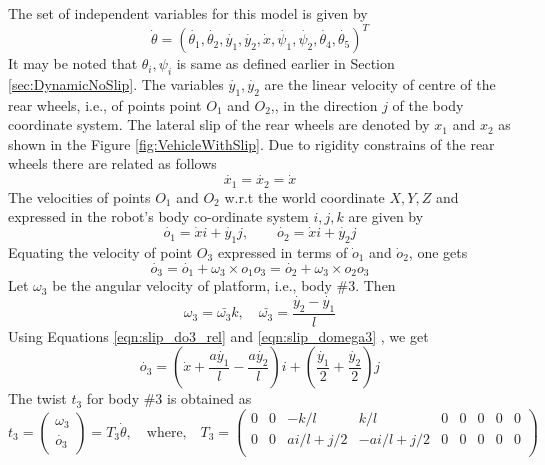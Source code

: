 
The set of independent variables for this model is given by
\begin{equation}
\label{eqn:theta_slip}
\dot{\theta}=(\dot{\theta_1},\dot{\theta_2}, \dot{y_1},\dot{y_2},\dot{x},\dot{\psi_1},\dot{\psi_2},\dot{\theta_4},\dot{\theta_5})^T
\end{equation}
It may be noted that $\theta_i,\psi_i$  is same as defined earlier in Section \ref{sec:DynamicNoSlip}. The variables $\dot{y_1},\dot{y_2}$ are the linear velocity of centre of the rear wheels, i.e., of points point $O_1$ and $O_2$,, in the direction $j$ of the body coordinate system. The lateral slip of the rear wheels are denoted by $x_1$ and $x_2$ as shown in the Figure \ref{fig:VehicleWithSlip}. Due to rigidity constrains of the rear wheels there are related as follows
\[\dot{x_1}=\dot{x_2}=\dot{x}\] 
The velocities of points $O_1$ and $ O_2$ w.r.t the world coordinate ${X,Y,Z}$ and expressed in the robot's body co-ordinate system ${i,j,k}$ are given by 
\begin{equation}
\label{eqn:slip_do1}
\dot{o_1}=\dot{x}i +\dot{y_1}j, \quad \quad  \dot{o_2}=\dot{x}i +\dot{y_2}j
\end{equation}
Equating the velocity of point $O_3$ expressed in terms of $\dot o_1$ and $\dot o_2$, one gets
\begin{equation}
\label{eqn:slip_do3_rel}
\dot{o_3}=\dot{o_1}+\omega_3\times o_1o_3=\dot{o_2}+\omega_3\times o_2o_3
\end{equation}
Let $\omega_3$ be the angular velocity of platform, i.e., body \#3. Then 
\begin{equation}
	\label{eqn:slip_domega3}
	\omega_3=\bar{\omega_3}k, \quad \bar{\omega_3}=\frac{\dot{y_2}-\dot{y_1}}{l} 
\end{equation}
Using Equations \ref{eqn:slip_do3_rel} and \ref{eqn:slip_domega3} , we get
\begin{equation}
\label{eqn:slip_do3}
\dot{o_3}=(\dot{x}+\frac{a\dot{y_1}}{l}-\frac{a \dot{y_2}}{l})i+(\frac{\dot{y_1}}{2}+\frac{\dot{y_2}}{2})j
\end{equation}
The twist $t_3$ for body \#3 is obtained as
\begin{equation}
\label{eqn:slip_t3}
t_3=
\begin{pmatrix}
\omega_3\\
\dot{o_3}
\end{pmatrix}=T_3 \dot{\theta}, \quad \text{where,} \quad 
T_3=
\begin{pmatrix}
0 & 0& -k/l & k/l & 0 &0 & 0 &0 &0\\
0 & 0& ai/l+ j/2& -ai/l+j/2 & 0 &0 & 0 &0 &0\\ 
\end{pmatrix}
\end{equation}
